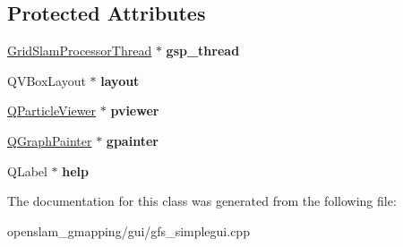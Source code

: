 \subsection*{Protected Attributes}
\begin{DoxyCompactItemize}
\item 
\mbox{\label{classGFSMainWindow_ac3fe323798a89c84e73113e2c896e1c0}} 
\hyperlink{structGridSlamProcessorThread}{Grid\+Slam\+Processor\+Thread} $\ast$ {\bfseries gsp\+\_\+thread}
\item 
\mbox{\label{classGFSMainWindow_a32dcf6529225bc4715b6230ba399c026}} 
Q\+V\+Box\+Layout $\ast$ {\bfseries layout}
\item 
\mbox{\label{classGFSMainWindow_a2ede4ba82512dda69db18ca24316c8fe}} 
\hyperlink{classGMapping_1_1QParticleViewer}{Q\+Particle\+Viewer} $\ast$ {\bfseries pviewer}
\item 
\mbox{\label{classGFSMainWindow_ae3e45bb6a4f02dc9d3a08deca7efd257}} 
\hyperlink{classQGraphPainter}{Q\+Graph\+Painter} $\ast$ {\bfseries gpainter}
\item 
\mbox{\label{classGFSMainWindow_a68738c4caffc808a3a25f8f5417ab8d0}} 
Q\+Label $\ast$ {\bfseries help}
\end{DoxyCompactItemize}


The documentation for this class was generated from the following file\+:\begin{DoxyCompactItemize}
\item 
openslam\+\_\+gmapping/gui/gfs\+\_\+simplegui.\+cpp\end{DoxyCompactItemize}
